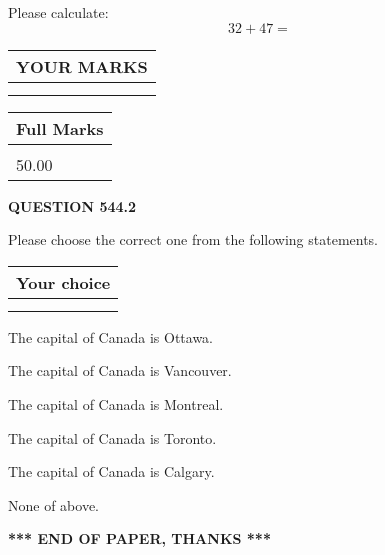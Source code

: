 \documentclass[12pt]{article}
\begin{document}
  
 
Please calculate:
\begin{equation}
32 +  %
47 = \nonumber
\end{equation}
 

 

 
  
\vspace{0.2in}
  
\noindent\begin{tabular}{|l|}
\hline
 YOUR MARKS  \\
\hline
 \\ 
 \\ 
\hline
\end{tabular}
\hspace{0.05in} \begin{tabular}{|l|}
\hline
 Full Marks  \\
\hline
 \\ 
50.00 \\
\hline
\end{tabular}
{\textbf{\Large{QUESTION
544.2 
}}}
  
  
Please choose the correct one from the following statements.
  
  
\noindent\hspace{3.0in} \begin{tabular}{|l|}
\hline
Your choice \\
\hline
 \\ 
 \\ 
\hline
\end{tabular}
  
  
 
 
The capital of Canada is Ottawa.
 
 
The capital of Canada is Vancouver.
 
 
The capital of Canada is Montreal.
 
 
The capital of Canada is Toronto.
 
 
The capital of Canada is Calgary.
 
 
 None of above.
 
 
   
   
 \vspace{0.2in}
 
   
   
   
   
\vspace{1.0in} 
{\textbf{\large{ *** END OF PAPER, THANKS *** }}} 
   
\end{document}
